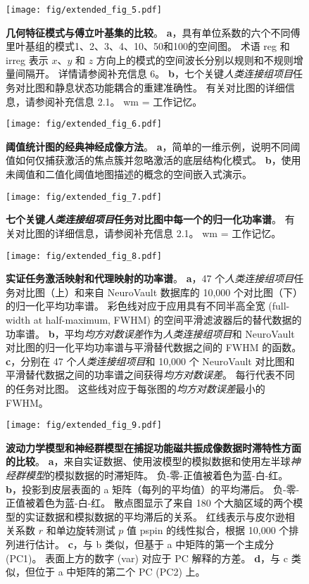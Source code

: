 \documentclass[lang=cn,a4paper,newtx,citestyle=gb7714-2015, bibstyle=gb7714-2015]{elegantpaper}
\begin{document}
\begin{figure}[!htb] 
	\centering
	\texttt{[image: fig/extended\_fig\_5.pdf]}
	\caption{\textbf{几何特征模式与傅立叶基集的比较}。
	\textbf{a}，具有单位系数的六个不同傅里叶基组的模式1、2、3、4、10、50和100的空间图。
	术语 reg 和 irreg 表示 $ x $、$ y $ 和 $ z $ 方向上的模式的空间波长分别以规则和不规则增量间隔开。
	详情请参阅补充信息 6。
	\textbf{b}，七个关键\textit{人类连接组项目}任务对比图和静息状态功能耦合的重建准确性。
	有关对比图的详细信息，请参阅补充信息 2.1。
	wm = 工作记忆。}
	\label{fig:extended_fig_5}
\end{figure}


\begin{figure}[!htb] 
	\centering
	\texttt{[image: fig/extended\_fig\_6.pdf]}
	\caption{\textbf{阈值统计图的经典神经成像方法}。
	\textbf{a}，简单的一维示例，说明不同阈值如何仅捕获激活的焦点簇并忽略激活的底层结构化模式。
	\textbf{b}，使用未阈值和二值化阈值地图描述的概念的空间嵌入式演示。}
	\label{fig:extended_fig_6}
\end{figure}


\begin{figure}[!htb] 
	\centering
	\texttt{[image: fig/extended\_fig\_7.pdf]}
	\caption{\textbf{七个关键\textit{人类连接组项目}任务对比图中每一个的归一化功率谱}。
	有关对比图的详细信息，请参阅补充信息 2.1。
	wm = 工作记忆。}
	\label{fig:extended_fig_7}
\end{figure}


\begin{figure}[!htb] 
	\centering
	\texttt{[image: fig/extended\_fig\_8.pdf]}
	\caption{\textbf{实证任务激活映射和代理映射的功率谱}。
	\textbf{a}，47 个\textit{人类连接组项目}任务对比图（上）和来自 NeuroVault 数据库的 10,000 个对比图（下）的归一化平均功率谱。
	彩色线对应于应用具有不同半高全宽 (full-width at
	half-maximum, FWHM) 的空间平滑滤波器后的替代数据的功率谱。
	\textbf{b}，平均\textit{均方对数误差}作为\textit{人类连接组项目}和 NeuroVault 对比图的归一化平均功率谱与平滑替代数据之间的 FWHM 的函数。
	\textbf{c}，分别在 47 个\textit{人类连接组项目}和 10,000 个 NeuroVault 对比图和平滑替代数据之间的功率谱之间获得\textit{均方对数误差}。
	每行代表不同的任务对比图。
	这些线对应于每张图的\textit{均方对数误差}最小的 FWHM。}
	\label{fig:extended_fig_8}
\end{figure}


\begin{figure}[!htb] 
	\centering
	\texttt{[image: fig/extended\_fig\_9.pdf]}
	\caption{\textbf{波动力学模型和神经群模型在捕捉功能磁共振成像数据时滞特性方面的比较}。
	\textbf{a}，来自实证数据、使用波模型的模拟数据和使用左半球\textit{神经群模型}的模拟数据的时滞矩阵。
	负-零-正值被着色为蓝-白-红。
	\textbf{b}，投影到皮层表面的 a 矩阵（每列的平均值）的平均滞后。
	负-零-正值被着色为蓝-白-红。
	散点图显示了来自 180 个大脑区域的两个模型的实证数据和模拟数据的平均滞后的关系。
	红线表示与皮尔逊相关系数 $ r $ 和单边旋转测试 $ p $ 值 pspin 的线性拟合，根据 10,000 个排列进行估计。 
	\textbf{c}，与 b 类似，但基于 a 中矩阵的第一个主成分 (PC1)。
	表面上方的数字 (var) 对应于 PC 解释的方差。
	\textbf{d}，与 c 类似，但位于 a 中矩阵的第二个 PC (PC2) 上。}
	\label{fig:extended_fig_9}
\end{figure}
\end{document}
